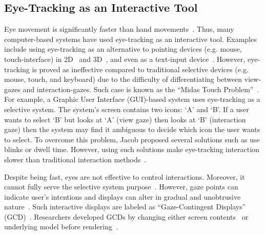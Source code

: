 \subsection{Eye-Tracking as an Interactive Tool}
\label{sec:EyeTrackingInteractive}
Eye movement is significantly faster than hand movements~\cite{sibert2000evaluation}. Thus, many computer-based systems have used eye-tracking as an interactive tool. Examples include using eye-tracking as an alternative to pointing devices (e.g. mouse, touch-interface) in 2D~\cite{Jacob91} and 3D~\cite{Bolt90, Tan00}, and even as a text-input device~\cite{Maj02}. However, eye-tracking is proved as ineffective compared to traditional selective devices (e.g. mouse, touch, and keyboard) due to the difficulty of differentiating between view-gazes and interaction-gazes. Such case is known as the ``Midas Touch Problem''~\cite{Jacob91}. For example, a Graphic User Interface (GUI)-based system uses eye-tracking as a selective system. The system's screen contains two icons: `A' and `B'. If a user wants to select `B' but looks at `A' (view gaze) then looks at `B' (interaction gaze) then the system may find it ambiguous to decide which icon the user wants to select. To overcome this problem, Jacob proposed several solutions such as use blinks or dwell time. However, using such solutions make eye-tracking interaction slower than traditional interaction methods~\cite{Jacob91}. 

Despite being fast, eyes are not effective to control interactions. Moreover, it cannot fully serve the selective system purpose~\cite{Zha99}. However, gaze points can indicate user's intentions and displays can alter in gradual and unobtrusive nature~\cite{Jacob91, Jacob03}. Such interactive displays are labeled as ``Gaze-Contingent Displays'' (GCD)~\cite{Duch07}.  Researchers developed GCDs by changing either screen contents~\cite{Rein03, PN02} or underlying model before rendering~\cite{Dan00, OD01, ODH02, Okoe14}. 

